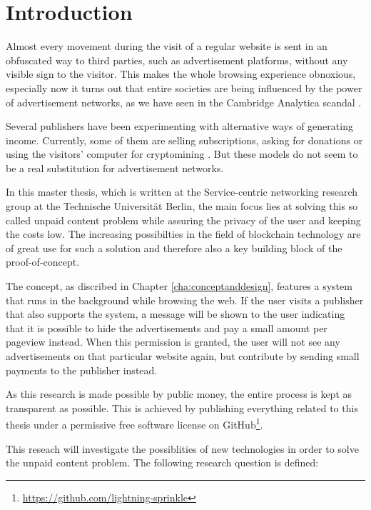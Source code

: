 \chapter{Introduction}
\label{cha:introduction}

 Almost every movement during the visit of a regular website is sent in an obfuscated way to third parties, such as advertisement platforms, without any visible sign to the visitor. This makes the whole browsing experience obnoxious, especially now it turns out that entire societies are being influenced by the power of advertisement networks, as we have seen in the Cambridge Analytica scandal \cite{cadwalladr2018cambridge}.

Several publishers have been experimenting with alternative ways of generating income. Currently, some of them are selling subscriptions, asking for donations or using the visitors' computer for cryptomining \cite{ruth2018digging}. But these models do not seem to be a real substitution for advertisement networks. 

In this master thesis, which is written at the Service-centric networking research group at the Technische Universität Berlin, the main focus lies at solving this so called unpaid content problem while assuring the privacy of the user and keeping the costs low. The increasing possibilties in the field of blockchain technology are of great use for such a solution and therefore also a key building block of the proof-of-concept.

The concept, as discribed in Chapter \ref{cha:conceptanddesign}, features a system that runs in the background while browsing the web. If the user visits a publisher that also supports the system, a message will be shown to the user indicating that it is possible to hide the advertisements and pay a small amount per pageview instead. When this permission is granted, the user will not see any advertisements on that particular website again, but contribute by sending small payments to the publisher instead.

As this research is made possible by public money, the entire process is kept as transparent as possible. This is achieved by publishing everything related to this thesis under a permissive free software license on GitHub\footnote{\url{https://github.com/lightning-sprinkle}}.

This reseach will investigate the possiblities of new technologies in order to solve the unpaid content problem. The following research question is defined:
\vspace{1em}


